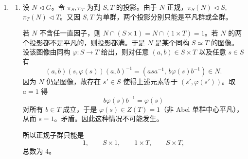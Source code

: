 \documentclass[UTF8,12pt]{ctexart}
\begin{document}
\begin{enumerate}[label=\textbf{\arabic*.},leftmargin=2.2em]
\begin{enumerate}[label=\textbf{(\alph*)},leftmargin=2.4em]
若 \(p=41\)，则 \(82\equiv0\pmod {41}\)，而 \(17^2\equiv2\pmod {41}\)。所以 \((17,0)\) 是 \(X^2-82Y^2=2\) 的模 \(41\) 解，且对 \(X\) 的偏导数 \(2X\) 在 \(X=17\) 处不为 \(0\)。再次由 Hensel 引理，它可提升到每个 \(\mathbb Z/41^n\mathbb Z\)。

于是 \(X^2-82Y^2=2\) 对每个奇素数幂模都有解。由上一问的线性变换，任一模 \(p^n\) 的 \(+2\) 解都会给出一个 \(-2\) 解。因此两个方程在 \(\mathbb Z/p^n\mathbb Z\) 中都有解。

\item 先记下 \(\sqrt{82}\) 的连分数：
\[
\sqrt{82}=[9;\overline{18}].
\]
事实上
\[
\sqrt{82}=9+(\sqrt{82}-9),\qquad
\frac1{\sqrt{82}-9}=\sqrt{82}+9,
\]
所以周期确为 \(18\)。其第 \(m\) 个收敛分数 \(p_m/q_m\) 满足
\[
p_m+q_m\sqrt{82}=(9+\sqrt{82})^{m+1},
\]
从而
\[
p_m^2-82q_m^2=N(9+\sqrt{82})^{m+1}=(-1)^{m+1}.
\]
也就是说，所有收敛分数只给出范数 \(\pm1\)。

现在若存在整数解 \(x^2-82y^2=\pm2\)。显然 \(y\ne0\)，并可同时改变 \(x,y\) 的符号使 \(y>0\)，再取 \(|x|\) 代替 \(x\) 使 \(x\ge0\)。由方程可知 \(\gcd(x,y)=1\)。于是
\[
\left|\sqrt{82}-\frac{x}{y}\right|
=\frac{|x^2-82y^2|}{y^2(\sqrt{82}+x/y)}
<\frac{2}{9y^2}<\frac1{2y^2}.
\]
由 Legendre 判别准则，满足该不等式且既约的有理数 \(x/y\) 必为 \(\sqrt{82}\) 的某个连分数收敛分数。因此应有
\[
x^2-82y^2=p_m^2-82q_m^2=\pm1,
\]
这与 \(x^2-82y^2=\pm2\) 矛盾。故整数解不存在。
\end{enumerate}

\item
\begin{enumerate}[label=\textbf{(\alph*)},leftmargin=2.4em]
\item 设 \(N\triangleleft G\)。令 \(\pi_S,\pi_T\) 为到 \(S,T\) 的投影。由于 \(N\) 正规，\(\pi_S(N)\triangleleft S\), \(\pi_T(N)\triangleleft T\)。又因 \(S,T\) 为单群，两个投影分别只能是平凡群或全群。

若 \(N\) 不含任一直因子，则 \(N\cap(S\times1)=N\cap(1\times T)=1\)。若 \(N\) 的两个投影都不是平凡的，则投影都满。于是 \(N\) 是某个同构 \(S\simeq T\) 的图像。设该图像由同构 \(\varphi:S\to T\) 给出，则对任意 \((a,b)\in S\times T\) 以及任意 \(s\in S\) 有
\[
(a,b)(s,\varphi(s))(a,b)^{-1}=(asa^{-1},\,b\varphi(s)b^{-1})\in N.
\]
因为 \(N\) 仍是图像，故存在 \(s'\in S\) 使得上述元素等于 \((s',\varphi(s'))\)。取 \(a=1\) 得
\[
b\varphi(s)b^{-1}=\varphi(s)
\]
对所有 \(b\in T\) 成立，于是 \(\varphi(s)\in Z(T)=1\)（非 Abel 单群中心平凡），从而 \(s=1\)。矛盾。因此这种情况不可能发生。

所以正规子群只能是
\[
1,\qquad S\times1,\qquad 1\times T,\qquad S\times T,
\]
总数为 \(4\)。


\end{enumerate}
\end{enumerate}
\end{document}

